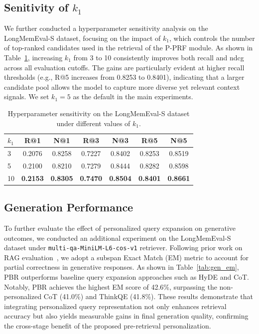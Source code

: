 \subsection*{Senitivity of $k_1$}
We further conducted a hyperparameter sensitivity analysis on the LongMemEval-S dataset, focusing on the impact of $k_1$, which controls the number of top-ranked candidates used in the retrieval of the P-PRF module. As shown in Table~\ref{tab:hyper_k1}, increasing $k_1$ from 3 to 10 consistently improves both {recall} and {ndcg} across all evaluation cutoffs. The gains are particularly evident at higher recall thresholds (e.g., R@5 increases from 0.8253 to 0.8401), indicating that a larger candidate pool allows the model to capture more diverse yet relevant context signals. We set $k_1=5$ as the default in the main experiments.

\begin{table}[htbp]
\setlength\tabcolsep{2.0pt}  %
\centering
\caption{Hyperparameter sensitivity on the LongMemEval-S dataset under different values of $k_1$.}
\begin{tabular}{lcccccc}
\toprule
\textbf{$k_1$} & \textbf{R@1} & \textbf{N@1} & \textbf{R@3} & \textbf{N@3} & \textbf{R@5} & \textbf{N@5} \\
\midrule
3  & 0.2076 & 0.8258 & 0.7227 & 0.8402 & 0.8253 & 0.8519 \\
5  & 0.2100 & 0.8210 & 0.7279 & 0.8444 & 0.8282 & 0.8598 \\
10 & \textbf{0.2153} & \textbf{0.8305} & \textbf{0.7470} & \textbf{0.8504} & \textbf{0.8401} & \textbf{0.8661} \\
\bottomrule
\end{tabular}
\label{tab:hyper_k1}
\end{table}


\subsection*{Generation Performance}
To further evaluate the effect of personalized query expansion on generative outcomes, we conducted an additional experiment on the LongMemEval-S dataset under \texttt{multi-qa-MiniLM-L6-cos-v1} retriever. Following prior work on RAG evaluation~\cite{adlakha2024evaluating}, we adopt a subspan Exact Match (EM) metric to account for partial correctness in generative responses. As shown in Table~\ref{tab:gen_em}, PBR outperforms baseline query expansion approaches such as HyDE and CoT. Notably, PBR achieves the highest EM score of 42.6\%, surpassing the non-personalized CoT (41.0\%) and ThinkQE (41.8\%). These results demonstrate that integrating personalized query representation not only enhances retrieval accuracy but also yields measurable gains in final generation quality, confirming the cross-stage benefit of the proposed pre-retrieval personalization.

